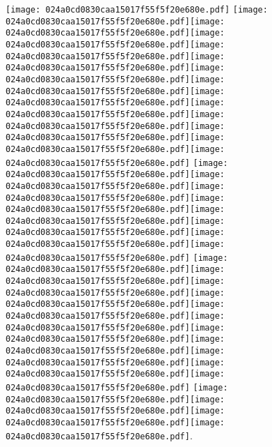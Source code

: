 \documentclass{article}
\newcommand{\origpg}[2]{\texttt{[image: 024a0cd0830caa15017f55f5f20e680e.pdf]}}
\begin{document}
{\vspace{9.811pt}\hspace{18.094pt}\origpg6{103.4pt 288.19pt 110.82pt 304.33pt} \origpg6{121.46pt 288.19pt 135.81pt 304.33pt}\hspace{-0.371pt}\origpg6{135.44pt 288.19pt 143.51pt 304.33pt}\hspace{-0.597pt}\origpg6{142.91pt 288.19pt 151.13pt 304.33pt}\origpg6{151.13pt 288.19pt 158.3pt 304.33pt}\hspace{-0.21pt}\origpg6{158.09pt 288.19pt 166.14pt 304.33pt}\origpg6{166.04pt 288.19pt 174.68pt 304.33pt}\origpg6{174.68pt 288.19pt 182.75pt 304.33pt}\hspace{0.145pt}\origpg6{182.89pt 288.19pt 190.96pt 304.33pt}\hspace{-0.113pt}\origpg6{190.85pt 288.19pt 198.47pt 304.33pt}\hspace{-0.145pt}\origpg6{198.32pt 288.19pt 205.49pt 304.33pt}\origpg6{205.54pt 288.19pt 214.17pt 304.33pt}\origpg6{214.17pt 288.19pt 222.81pt 304.33pt}\origpg6{222.87pt 288.19pt 230.04pt 304.33pt} \origpg6{233.95pt 288.19pt 242.16pt 304.33pt}\hspace{-0.258pt}\origpg6{241.9pt 288.19pt 250.54pt 304.33pt}\origpg6{250.54pt 288.19pt 259.17pt 304.33pt}\origpg6{259.24pt 288.19pt 266.4pt 304.33pt}\origpg6{266.45pt 288.19pt 276.67pt 304.33pt}\origpg6{276.57pt 288.19pt 285.21pt 304.33pt}\hspace{-0.21pt}\origpg6{285pt 288.19pt 292.84pt 304.33pt}\origpg6{292.94pt 288.19pt 301.57pt 304.33pt} \origpg6{305.45pt 288.19pt 313.52pt 304.33pt}\origpg6{313.61pt 288.19pt 320.78pt 304.33pt}\hspace{-0.178pt}\origpg6{320.6pt 288.19pt 333.03pt 304.33pt}\origpg6{333.11pt 288.19pt 340.28pt 304.33pt}\hspace{-0.178pt}\origpg6{340.1pt 288.19pt 347.15pt 304.33pt}\hspace{-0.307pt}\origpg6{346.85pt 288.19pt 354.92pt 304.33pt}\hspace{-0.597pt}\origpg6{354.32pt 288.19pt 362.44pt 304.33pt}\hspace{-0.161pt}\origpg6{362.28pt 288.19pt 370.91pt 304.33pt}\origpg6{370.91pt 288.19pt 378.98pt 304.33pt}\origpg6{378.9pt 288.19pt 385.52pt 304.33pt}\hspace{-0.597pt}\origpg6{384.92pt 288.19pt 392.99pt 304.33pt} \origpg6{396.96pt 288.19pt 403.58pt 304.33pt}\hspace{-0.113pt}\origpg6{403.47pt 288.19pt 410.63pt 304.33pt}\origpg6{410.68pt 288.19pt 417.06pt 304.33pt}\hspace{-0.113pt}\origpg6{416.94pt 288.19pt 424.11pt 304.33pt}. 

}
\end{document}
